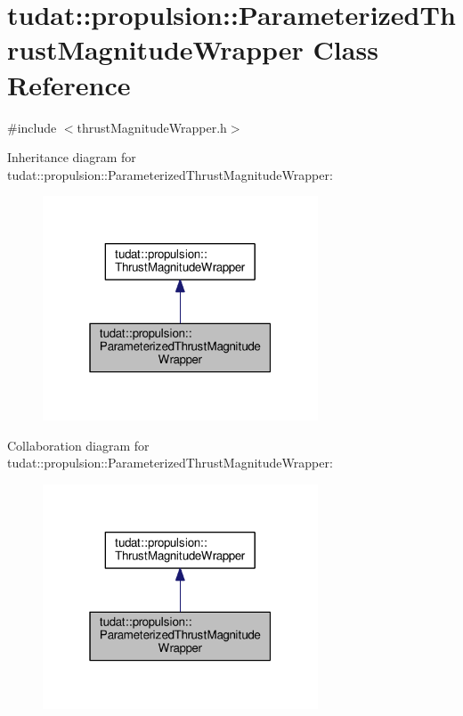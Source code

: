 \hypertarget{classtudat_1_1propulsion_1_1ParameterizedThrustMagnitudeWrapper}{}\section{tudat\+:\+:propulsion\+:\+:Parameterized\+Thrust\+Magnitude\+Wrapper Class Reference}
\label{classtudat_1_1propulsion_1_1ParameterizedThrustMagnitudeWrapper}


{\ttfamily \#include $<$thrust\+Magnitude\+Wrapper.\+h$>$}



Inheritance diagram for tudat\+:\+:propulsion\+:\+:Parameterized\+Thrust\+Magnitude\+Wrapper\+:
\nopagebreak
\begin{figure}[H]
\begin{center}
\leavevmode
\includegraphics[width=232pt]{classtudat_1_1propulsion_1_1ParameterizedThrustMagnitudeWrapper__inherit__graph}
\end{center}
\end{figure}


Collaboration diagram for tudat\+:\+:propulsion\+:\+:Parameterized\+Thrust\+Magnitude\+Wrapper\+:
\nopagebreak
\begin{figure}[H]
\begin{center}
\leavevmode
\includegraphics[width=232pt]{classtudat_1_1propulsion_1_1ParameterizedThrustMagnitudeWrapper__coll__graph}
\end{center}
\end{figure}
